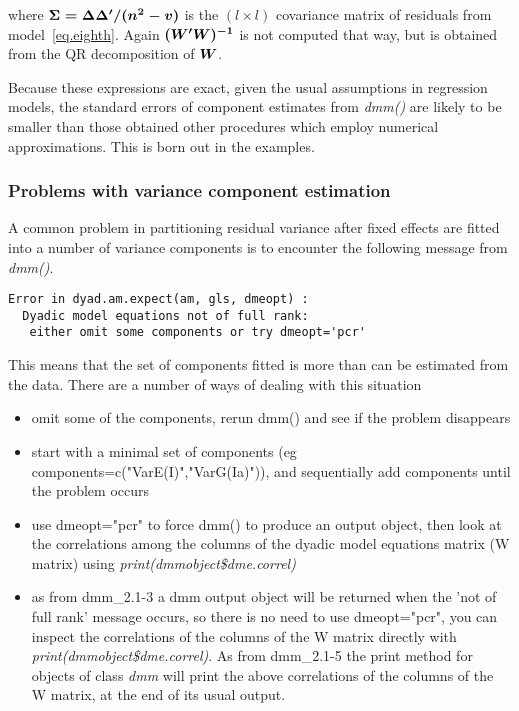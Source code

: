 \documentclass[titlepage]{article}  %
\begin{document}
where $\mbox{\boldmath $\Sigma = \Delta \Delta^{\prime}/(n^{2}-v)$}$ is the $(l \times l)$ covariance matrix of residuals from model~\ref{eq.eighth}. Again $\mbox{\boldmath $(W^{\prime}W)^{-1}$}$ is not computed that way, but is obtained from the QR decomposition of $\mbox{\boldmath $W$}$. 

Because these expressions are exact, given the usual assumptions in regression models, the standard errors of component estimates from {\em dmm()} are likely to be smaller than those obtained other procedures which employ numerical approximations. This is born out in the examples.

\subsubsection{Problems with variance component estimation}
A common problem in partitioning residual variance after fixed effects are fitted into a number of variance components is to encounter the following message from {\em dmm()}.
\begin{verbatim}
Error in dyad.am.expect(am, gls, dmeopt) : 
  Dyadic model equations not of full rank:
   either omit some components or try dmeopt='pcr' 
\end{verbatim}
This means that the set of components fitted is more than can be estimated from the data. There are a  number of ways of dealing with this situation
\begin{itemize}
\item omit some of the components, rerun dmm() and see if the problem disappears
\item start with a  minimal set of components (eg components=c("VarE(I)","VarG(Ia)")), and sequentially add components until the problem occurs
\item use dmeopt="pcr" to force dmm() to produce an output object, then look at the correlations among the columns of the dyadic model equations matrix (W matrix) using {\em print(dmmobject\$dme.correl)} 
\item as from dmm\_2.1-3 a dmm output object will be returned when the 'not of full rank' message occurs, so there is no need to use dmeopt="pcr", you can inspect the correlations of the columns of the W matrix directly with {\em print(dmmobject\$dme.correl)}. As from dmm\_2.1-5 the print method for objects of class {\em dmm} will print the above correlations of the columns of the W matrix, at the end of its usual output. 
\end{itemize}
\end{document}
